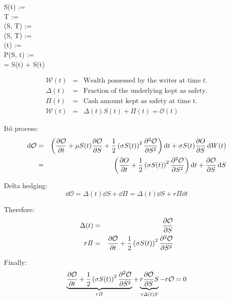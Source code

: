 \renewcommand{\O}{\mathcal{O}}
\newcommand{\W}{\mathcal{W}}
\newcommand{\Piit}{\mathit{\Pi}}

\usepackage{physics}

S(t) :=  \\
T :=  \\
(S, T) :=  \\
(S, T) :=  \\
(t) :=  \\
P(S, t) :=  \\

 = \mu S(t)  + \sigma S(t) 

\begin{eqnarray*}
\W(t)               & = & \text{Wealth possessed by the writer at time $t$.} \\
\Delta(t)           & = & \text{Fraction of the underlying kept as safety.}\\
\mathit{\Pi(t)}     & = & \text{Cash amount kept as safety at time t.}\\
\W (t)              & = & \Delta (t)S(t) + \mathit{\Pi (t)} = \O(t)
\end{eqnarray*}

Itô process:
\begin{eqnarray*}
\dd{\O} & = & \left( \pdv{\O}{t} + \mu S(t) \pdv{\O}{S} + \frac{1}{2} \left( \sigma S(t) \right)^2 \pdv[2]{\O}{S} \right) \dd{t} + \sigma S(t) \pdv{O}{S}\dd{W(t)} \\
& = & \left( \pdv{O}{t} + \frac{1}{2}\left( \sigma S(t) \right)^2 \pdv[2]{\O}{S} \right) \dd{t} + \pdv{\O}{S}\dd{S}
\end{eqnarray*}

Delta hedging:
\begin{equation*}
    \dd{\O} = \Delta (t) \dd{S} + \dd{\Piit} = \Delta(t)\dd{S} + r\Piit \dd{t}
\end{equation*}

Therefore:
\begin{eqnarray*}
    \Delta(t) &=& \pdv{\O}{S} \\
    r\Piit    &=& \pdv{\O}{t} + \frac{1}{2} \left( \sigma S(t) \right)^2 \pdv[2]{\O}{S}
\end{eqnarray*}

Finally:
\begin{equation*}
    \underbrace{\pdv{\O}{t} + \frac{1}{2} \left( \sigma S(t) \right)^2 \pdv[2]{\O}{S}}_{r \Piit} + \underbrace{r \pdv{\O}{S} S}_{r \Delta(t) S} - r \O = 0
\end{equation*}


